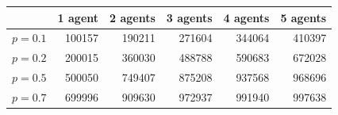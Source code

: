 \documentclass{article}
\makeatletter
\newenvironment{tablehere}
{\def\@captype{table}}
{}
\makeatother
\begin{document}
	\begin{tablehere}
		\centering
		\begin{tabular}{|r|rrrrr|}
			\hline
			& 1 agent & 2 agents & 3 agents& 4 agents& 5 agents\\
			\hline
			$p=0.1$ & 100157 & 190211 & 271604 & 344064 & 410397\\
			$p=0.2$ & 200015 & 360030 & 488788 & 590683 & 672028\\
			$p=0.5$ & 500050 & 749407 & 875208 & 937568 & 968696\\
			$p=0.7$ & 699996 & 909630 & 972937 & 991940 & 997638\\
			\hline
		\end{tabular}
		\label{tab:turns}
	\end{tablehere}
\end{document}
